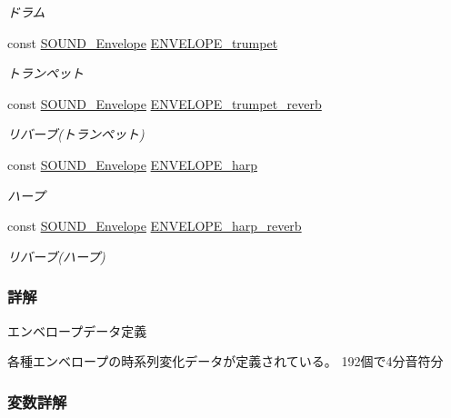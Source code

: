 \begin{DoxyCompactItemize}
\begin{DoxyCompactList}\small\item\em ドラム \end{DoxyCompactList}\item 
const \hyperlink{sound_8h_d0/d92/structSOUND__Envelope}{S\+O\+U\+N\+D\+\_\+\+Envelope} \hyperlink{envelope_8h_a64e82900a8bb3283e52171b1dffe4671_a64e82900a8bb3283e52171b1dffe4671}{E\+N\+V\+E\+L\+O\+P\+E\+\_\+trumpet}
\begin{DoxyCompactList}\small\item\em トランペット \end{DoxyCompactList}\item 
const \hyperlink{sound_8h_d0/d92/structSOUND__Envelope}{S\+O\+U\+N\+D\+\_\+\+Envelope} \hyperlink{envelope_8h_add0470ed0e929a88f3d7d34102e8511b_add0470ed0e929a88f3d7d34102e8511b}{E\+N\+V\+E\+L\+O\+P\+E\+\_\+trumpet\+\_\+reverb}
\begin{DoxyCompactList}\small\item\em リバーブ(トランペット) \end{DoxyCompactList}\item 
const \hyperlink{sound_8h_d0/d92/structSOUND__Envelope}{S\+O\+U\+N\+D\+\_\+\+Envelope} \hyperlink{envelope_8h_a8032eea1996dd0a2f63c1fa84f61d449_a8032eea1996dd0a2f63c1fa84f61d449}{E\+N\+V\+E\+L\+O\+P\+E\+\_\+harp}
\begin{DoxyCompactList}\small\item\em ハープ \end{DoxyCompactList}\item 
const \hyperlink{sound_8h_d0/d92/structSOUND__Envelope}{S\+O\+U\+N\+D\+\_\+\+Envelope} \hyperlink{envelope_8h_acb0fb5da94d32bb1177e380892005456_acb0fb5da94d32bb1177e380892005456}{E\+N\+V\+E\+L\+O\+P\+E\+\_\+harp\+\_\+reverb}
\begin{DoxyCompactList}\small\item\em リバーブ(ハープ) \end{DoxyCompactList}\end{DoxyCompactItemize}


\subsubsection{詳解}
エンベロープデータ定義 

各種エンベロープの時系列変化データが定義されている。 192個で4分音符分

 

\subsubsection{変数詳解}
